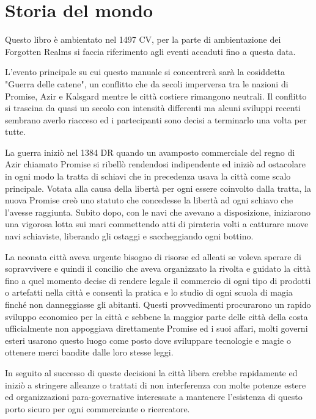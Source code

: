 \documentclass[letterpaper,twocolumn,openany,nodeprecatedcode]{dndbook}
\begin{document}
\section{Storia del mondo}

Questo libro è ambientato nel 1497 CV, per la parte di ambientazione dei Forgotten Realms si faccia riferimento agli eventi accaduti fino a questa data.

L'evento principale su cui questo manuale si concentrerà sarà la cosiddetta "Guerra delle catene", un conflitto che da secoli imperversa tra le nazioni di Promise, Azir e Kalsgard mentre le città costiere rimangono neutrali. Il conflitto si trascina da quasi un secolo con intensità differenti ma alcuni sviluppi recenti sembrano averlo riacceso ed i partecipanti sono decisi a terminarlo una volta per tutte.

La guerra iniziò nel 1384 DR quando un avamposto commerciale del regno di Azir chiamato Promise si ribellò rendendosi indipendente ed iniziò ad ostacolare in ogni modo la tratta di schiavi che in precedenza usava la città come scalo principale. Votata alla causa della libertà per ogni essere coinvolto dalla tratta, la nuova Promise creò uno statuto che concedesse la libertà ad ogni schiavo che l'avesse raggiunta. Subito dopo, con le navi che avevano a disposizione, iniziarono una vigorosa lotta sui mari commettendo atti di pirateria volti a catturare nuove navi schiaviste, liberando gli ostaggi e saccheggiando ogni bottino. 

La neonata città aveva urgente bisogno di risorse ed alleati se voleva sperare di sopravvivere e quindi il concilio che aveva organizzato la rivolta e guidato la città fino a quel momento decise di rendere legale il commercio di ogni tipo di prodotti o artefatti nella città e consentì la pratica e lo studio di ogni scuola di magia finché non danneggiasse gli abitanti. Questi provvedimenti procurarono un rapido sviluppo economico per la città e sebbene la maggior parte delle città della costa ufficialmente non appoggiava direttamente Promise ed i suoi affari, molti governi esteri usarono questo luogo come posto dove sviluppare tecnologie e magie o ottenere merci bandite dalle loro stesse leggi.

In seguito al successo di queste decisioni la città libera crebbe rapidamente ed iniziò a stringere alleanze o trattati di non interferenza con molte potenze estere ed organizzazioni para-governative interessate a mantenere l'esistenza di questo porto sicuro per ogni commerciante o ricercatore.
\end{document}
